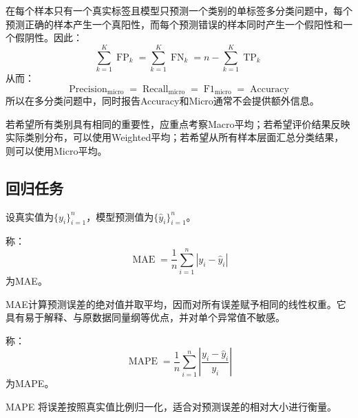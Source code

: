 \begin{note}
	在每个样本只有一个真实标签且模型只预测一个类别的单标签多分类问题中，每个预测正确的样本产生一个真阳性，而每个预测错误的样本同时产生一个假阳性和一个假阴性。因此：
	\begin{equation*}
		\sum_{k=1}^{K}\operatorname{FP}_k=\sum_{k=1}^{K}\operatorname{FN}_k=n-\sum_{k=1}^{K}\operatorname{TP}_k
	\end{equation*}
	从而：
	\begin{equation*}
		\operatorname{Precision}_{\mathrm{micro}}=\operatorname{Recall}_{\mathrm{micro}}=\operatorname{F1}_{\mathrm{micro}}=\operatorname{Accuracy}
	\end{equation*}
	所以在多分类问题中，同时报告Accuracy和Micro通常不会提供额外信息。\par
	若希望所有类别具有相同的重要性，应重点考察Macro平均；若希望评价结果反映实际类别分布，可以使用Weighted平均；若希望从所有样本层面汇总分类结果，则可以使用Micro平均。
\end{note}

\subsection{回归任务}
设真实值为$\{y_i\}_{i=1}^{n}$，模型预测值为$\{\hat{y}_i\}_{i=1}^{n}$。
\begin{definition}
	称：
	\begin{equation*}
		\operatorname{MAE}=\frac{1}{n}\sum_{i=1}^n|y_i-\hat{y}_i|
	\end{equation*}
	为\gls{MAE}。
\end{definition}
\begin{note}
	MAE计算预测误差的绝对值并取平均，因而对所有误差赋予相同的线性权重。它具有易于解释、与原数据同量纲等优点，并对单个异常值不敏感。
\end{note}
\begin{definition}
	称：
	\begin{equation*}
		\operatorname{MAPE}=\frac{1}{n}\sum_{i=1}^n\left|\frac{y_i-\hat{y}_i}{y_i}\right|
	\end{equation*}
	为\gls{MAPE}。
\end{definition}
\begin{note}
	MAPE 将误差按照真实值比例归一化，适合对预测误差的相对大小进行衡量。
\end{note}